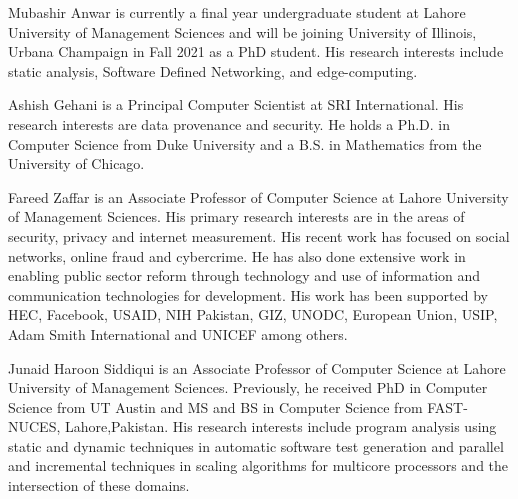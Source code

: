 \documentclass[10pt,journal,compsoc]{IEEEtran}
\begin{document}
\begin{IEEEbiographynophoto}{Mubashir Anwar}
is currently a final year undergraduate student at Lahore University of Management Sciences and will be joining University of Illinois, Urbana Champaign in Fall 2021 as a PhD student. His research interests include static analysis, Software Defined Networking, and edge-computing.\end{IEEEbiographynophoto}

\begin{IEEEbiographynophoto}{Ashish Gehani}
is a Principal Computer Scientist at SRI International. His research interests are data provenance and security. He holds a Ph.D. in Computer Science from Duke University and a B.S. in Mathematics from the University of Chicago.

\end{IEEEbiographynophoto}

\begin{IEEEbiographynophoto}{Fareed Zaffar}
is an Associate Professor of Computer Science at Lahore University of Management Sciences. His primary research interests are in the areas of security, privacy and internet measurement. His recent work has focused on social networks, online fraud and cybercrime. He has also done extensive work in enabling public sector reform through technology and use of information and communication technologies for development. His work has been supported by HEC, Facebook, USAID, NIH Pakistan, GIZ, UNODC, European Union, USIP, Adam Smith International and UNICEF among others. 
\end{IEEEbiographynophoto}

\begin{IEEEbiographynophoto}{Junaid Haroon Siddiqui}
is an Associate Professor of Computer Science at Lahore University of Management Sciences. Previously, he received PhD in Computer Science from UT Austin and MS and BS in Computer Science from FAST-NUCES, Lahore,Pakistan. His research interests include program analysis using static and dynamic techniques in automatic software test generation and parallel and incremental techniques in scaling algorithms for multicore processors and the intersection of these domains. \end{IEEEbiographynophoto}
\end{document}
